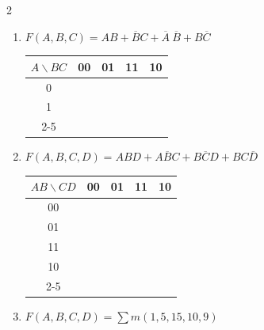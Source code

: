 \documentclass[12pt,a4paper]{article}
\begin{document}
\begin{multicols}{2}
\begin{enumerate}[label=\alph*)]
  \item \begin{minipage}[t]{\linewidth}
    $F(A,B,C) = AB + \overline{B}C + \overline{A}~\overline{B} + B\overline{C}$

    \begin{center}
      \begin{tabular}{c|c|c|c|c|}
        $A \backslash BC$ & 00 & 01 & 11 & \multicolumn{1}{c}{10} \\
        \hline
        0 & \phantom{0} & \phantom{0} & \phantom{0} & \phantom{0} \\
        \hline
        1 & \phantom{0} & \phantom{0} & \phantom{0} & \phantom{0} \\
        \cline{2-5}
      \end{tabular}
    \end{center}
  \end{minipage}

  \item \begin{minipage}[t]{\linewidth}
    {\small $F(A,B,C,D) = ABD + A\overline{B}C + B\overline{C}D + BC\overline{D}$}

    \begin{center}
      \begin{tabular}{c|c|c|c|c|}
        $AB \backslash CD$ & 00 & 01 & 11 & \multicolumn{1}{c}{10} \\
        \hline
        00 & \phantom{0} & \phantom{0} & \phantom{0} & \phantom{0} \\
        \hline
        01 & \phantom{0} & \phantom{0} & \phantom{0} & \phantom{0} \\
        \hline
        11 & \phantom{0} & \phantom{0} & \phantom{0} & \phantom{0} \\
        \hline
        10 & \phantom{0} & \phantom{0} & \phantom{0} & \phantom{0} \\
        \cline{2-5}
      \end{tabular}
    \end{center}
  \end{minipage}

  \item \begin{minipage}[t]{\linewidth}
    $F(A,B,C,D) = \sum m(1, 5, 15, 10, 9)$


\end{minipage}
\end{enumerate}
\end{multicols}
\end{document}
